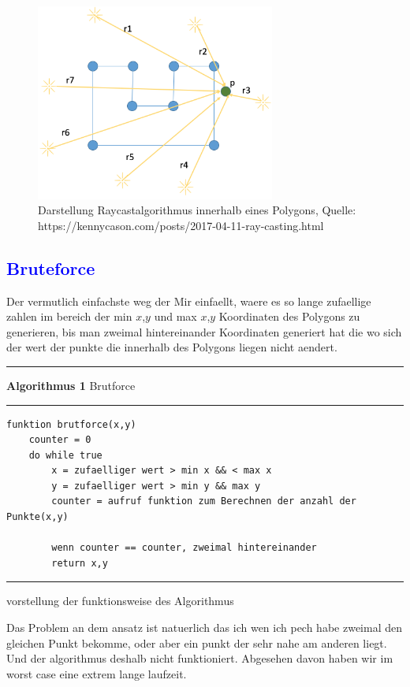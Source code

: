 \documentclass{article}
\begin{document}
\begin{figure}[h]
    \centering
    \includegraphics[width=0.7\textwidth]{Bilder/raycasting_polygon_3.png}
    \caption{Darstellung Raycastalgorithmus innerhalb eines Polygons, Quelle: https://kennycason.com/posts/2017-04-11-ray-casting.html}
    \label{fig:example}
\end{figure}

\subsection{\textcolor{blue}{Bruteforce}}
Der vermutlich einfachste weg der Mir einfaellt, waere es so lange zufaellige zahlen im bereich der min $x$,$y$ und max $x$,$y$ Koordinaten des Polygons zu generieren, bis man zweimal hintereinander Koordinaten generiert hat die wo sich der wert der punkte die innerhalb des Polygons liegen nicht aendert.
\vspace{5pt}
\hrule
\vspace{1.5pt}
\large{\textbf{Algorithmus 1} Brutforce}
\vspace{1.5pt}
\hrule
\begin{verbatim}
funktion brutforce(x,y)
	counter = 0
	do while true
		x = zufaelliger wert > min x && < max x
		y = zufaelliger wert > min y && max y
		counter = aufruf funktion zum Berechnen der anzahl der Punkte(x,y)
		
		wenn counter == counter, zweimal hintereinander
		return x,y 
\end{verbatim}
\hrule
vorstellung der funktionsweise des Algorithmus\par
\vspace{5pt}
\raggedright 
Das Problem an dem ansatz ist natuerlich das ich wen ich pech habe zweimal den gleichen Punkt bekomme, oder aber ein punkt der sehr nahe am anderen liegt. Und der algorithmus deshalb nicht funktioniert. Abgesehen davon haben wir im worst case eine extrem lange laufzeit.
\end{document}
